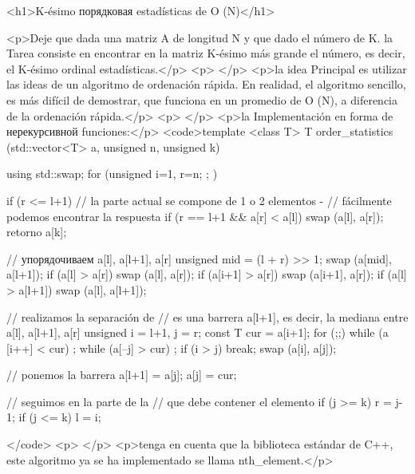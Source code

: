 <h1>K-ésimo порядковая estadísticas de O (N)</h1>

<p>Deje que dada una matriz A de longitud N y que dado el número de K. la Tarea consiste en encontrar en la matriz K-ésimo más grande el número, es decir, el K-ésimo ordinal estadísticas.</p>
<p> </p>
<p>la idea Principal es utilizar las ideas de un algoritmo de ordenación rápida. En realidad, el algoritmo sencillo, es más difícil de demostrar, que funciona en un promedio de O (N), a diferencia de la ordenación rápida.</p>
<p> </p>
<p>la Implementación en forma de нерекурсивной funciones:</p>
<code>template <class T>
T order_statistics (std::vector<T> a, unsigned n, unsigned k)
{
using std::swap;
for (unsigned i=1, r=n; ; )
{

if (r <= l+1)
{
// la parte actual se compone de 1 o 2 elementos -
// fácilmente podemos encontrar la respuesta
if (r == l+1 && a[r] < a[l])
swap (a[l], a[r]);
retorno a[k];
}

// упорядочиваем a[l], a[l+1], a[r]
unsigned mid = (l + r) >> 1;
swap (a[mid], a[l+1]);
if (a[l] > a[r])
swap (a[l], a[r]);
if (a[i+1] > a[r])
swap (a[i+1], a[r]);
if (a[l] > a[l+1])
swap (a[l], a[l+1]);

// realizamos la separación de
// es una barrera a[l+1], es decir, la mediana entre a[l], a[l+1], a[r]
unsigned
i = l+1,
j = r;
const T
cur = a[i+1];
for (;;)
{
while (a [i++] < cur) ;
while (a[--j] > cur) ;
if (i > j)
break;
swap (a[i], a[j]);
}

// ponemos la barrera
a[l+1] = a[j];
a[j] = cur;

// seguimos en la parte de la
// que debe contener el elemento
if (j >= k)
r = j-1;
if (j <= k)
l = i;

}
}</code>
<p> </p>
<p>tenga en cuenta que la biblioteca estándar de C++, este algoritmo ya se ha implementado se llama nth_element.</p>